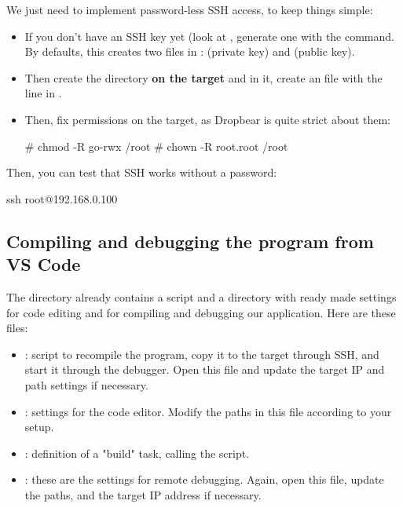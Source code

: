 We just need to implement password-less SSH access, to keep things
simple:

\begin{itemize}
  \item If you don't have an SSH key yet (look at ,
	generate one with the  command.
	By defaults, this creates two files in :
	 (private key) and  (public key).
  \item Then create the  directory {\bf on the target}
        and in it, create an  file with the line in
        .
  \item Then, fix permissions on the target, as Dropbear is quite strict
        about them:
        \begin{bashinput}
# chmod -R go-rwx /root
# chown -R root.root /root
        \end{bashinput}
\end{itemize}

Then, you can test that SSH works without a password:

\begin{bashinput}
ssh root@192.168.0.100
\end{bashinput}

\subsection{Compiling and debugging the program from VS Code}

The  directory already contains a 
script and a  directory with ready made settings for
code editing and for compiling and debugging our application.
Here are these files:

\begin{itemize}
   \item {}: script to recompile the program,
         copy it to the target through SSH, and start it through the debugger.
         Open this file and update the target IP and path settings if
         necessary.
   \item {}: settings for the code editor.
         Modify the paths in this file according to your setup.
   \item {}: definition of a "build" task,
         calling the  script.
   \item {}: these are the settings for remote
         debugging. Again, open this file, update the paths, and the
	 target IP address if necessary.
\end{itemize}

